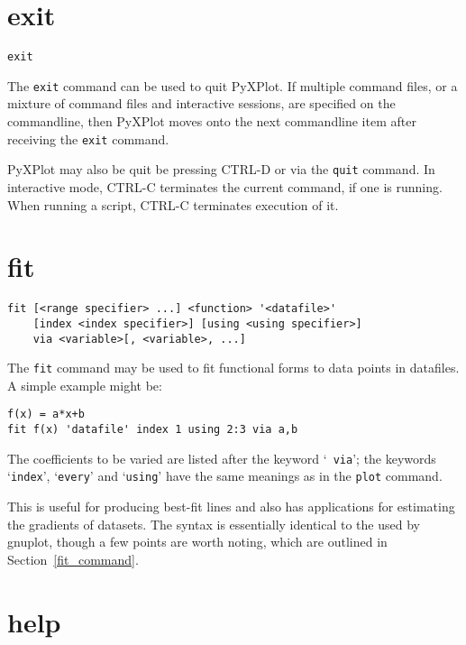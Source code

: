 \documentclass[a4paper,onecolumn,11pt]{book}
\begin{document}
\section{exit}

\begin{verbatim}
exit
\end{verbatim}

The {\tt exit} command can be used to quit PyXPlot. If multiple command files,
or a mixture of command files and interactive sessions, are specified on the
commandline, then PyXPlot moves onto the next commandline item after receiving
the {\tt exit} command.

PyXPlot may also be quit be pressing CTRL-D or via the {\tt quit} command. In
interactive mode, CTRL-C terminates the current command, if one is running.
When running a script, CTRL-C terminates execution of it.


\section{fit}

\begin{verbatim}
fit [<range specifier> ...] <function> '<datafile>'
    [index <index specifier>] [using <using specifier>]
    via <variable>[, <variable>, ...]
\end{verbatim}

The {\tt fit} command may be used to fit functional forms to data points in
datafiles. A simple example might be:

\begin{verbatim}
f(x) = a*x+b
fit f(x) 'datafile' index 1 using 2:3 via a,b
\end{verbatim}

\noindent The coefficients to be varied are listed after the keyword `{\tt
via}'; the keywords `{\tt index}', `{\tt every}' and `{\tt using}' have the
same meanings as in the {\tt plot} command.

This is useful for producing best-fit lines and also has applications for
estimating the gradients of datasets.  The syntax is essentially identical to
the used by gnuplot, though a few points are worth noting, which are outlined
in Section~\ref{fit_command}.

\section{help}
\end{document}
